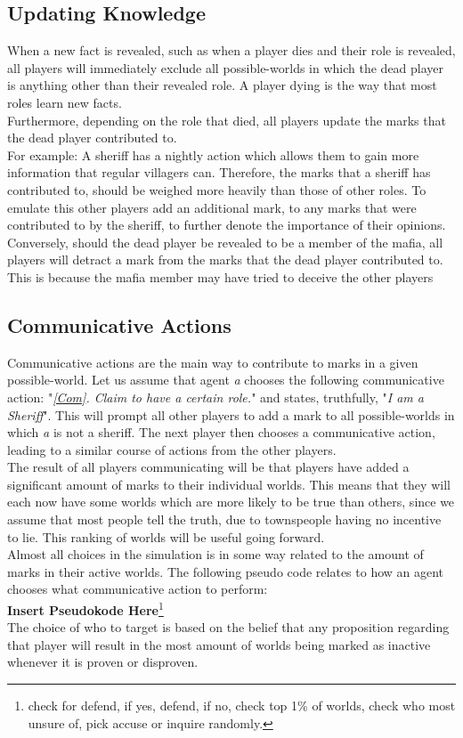 \subsection{Updating Knowledge}\label{UpdatingKnowledge}
When a new fact is revealed, such as when a player dies and their role is 
revealed, all players will immediately exclude all possible-worlds in which the dead 
player is anything other than their revealed role. A player dying is the way 
that most roles learn new facts.\\
Furthermore, depending on the role that died, all players update the marks that 
the dead player contributed to.\\
For example: A sheriff has a nightly action which allows them to gain more 
information that regular villagers can. Therefore, the marks that a sheriff has 
contributed to, should be weighed more heavily than those of other roles. To 
emulate this other players add an additional mark, to any marks that were 
contributed to by the sheriff, to further denote the importance of their 
opinions. \\
Conversely, should the dead player be revealed to be a member of the mafia, all 
players will detract a mark from the marks that the dead player contributed to. 
This is because the mafia member may have tried to deceive the other players
\subsection{Communicative Actions}\label{CommunicativeActions}
Communicative actions are the main way to contribute to marks in a given 
possible-world. Let us assume that agent \textit{a} chooses the following communicative 
action: "\textit{\ref{Com}. Claim to have a certain role.}" and states, truthfully, 
"\textit{I am a Sheriff}". This will prompt all other players to add a mark to 
all possible-worlds in which \textit{a} is not a sheriff. The next player then chooses a communicative action, leading to a similar 
course of actions from the other players. \\
The result of all players communicating will be that players 
have added a significant amount of marks to their individual worlds. This 
means that they will each now have some worlds which are more likely to be true 
than others, since we assume that most people tell the truth, due to 
townspeople having no incentive to lie. This ranking of worlds will be useful 
going forward.\\
Almost all choices in the simulation is in some way related to the amount of 
marks in their active worlds. The following pseudo code relates to how an agent 
chooses what communicative action to perform: \\
\textbf{\*Insert Pseudokode Here\*}\footnote[1]{check for defend, if yes, 
defend, if no, check top 1\% of worlds, check who most unsure of, pick accuse 
or inquire randomly.}\\
The choice of who to target is based on the belief that any proposition 
regarding that player will result in the most amount of worlds being marked as 
inactive whenever it is proven or disproven.
